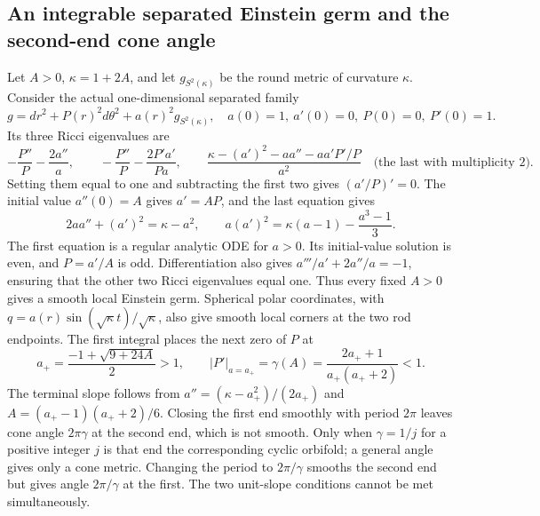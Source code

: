 \documentclass[a4paper,11pt]{article}
\numberwithin{equation}{section}
\theoremstyle{definition}
\begin{document}
\subsection{An integrable separated Einstein germ and the second-end cone angle}
Let $A>0$, $\kappa=1+2A$, and let $g_{S^2(\kappa)}$ be the round metric of curvature $\kappa$.
Consider the actual one-dimensional separated family
\begin{equation}\label{eq:toric-separated-metric}
 g=dr^2+P(r)^2d\theta^2+a(r)^2g_{S^2(\kappa)},\quad
 a(0)=1,\ a'(0)=0,\ P(0)=0,\ P'(0)=1.
\end{equation}
Its three Ricci eigenvalues are
\begin{equation}\label{eq:toric-separated-Ricci}
 -\frac{P''}{P}-\frac{2a''}{a},\qquad
 -\frac{P''}{P}-\frac{2P'a'}{Pa},\qquad
 \frac{\kappa-(a')^2-aa''-aa'P'/P}{a^2}\quad\text{(the last with multiplicity 2)}.
\end{equation}
Setting them equal to one and subtracting the first two gives $(a'/P)'=0$.
The initial value $a''(0)=A$ gives $a'=AP$, and the last equation gives
\begin{equation}\label{eq:toric-separated-first}
 2aa''+(a')^2=\kappa-a^2,\qquad
 a(a')^2=\kappa(a-1)-\frac{a^3-1}{3}.
\end{equation}
The first equation is a regular analytic ODE for $a>0$. Its initial-value solution is even, and $P=a'/A$ is odd.
Differentiation also gives $a'''/a'+2a''/a=-1$, ensuring that the other two Ricci eigenvalues equal one.
Thus every fixed $A>0$ gives a smooth local Einstein germ.
Spherical polar coordinates, with $q=a(r)\sin(\sqrt\kappa t)/\sqrt\kappa$, also give smooth local corners at the two rod endpoints.
The first integral places the next zero of $P$ at
\begin{equation}\label{eq:toric-separated-angle}
 a_+=\frac{-1+\sqrt{9+24A}}2>1,\qquad
 |P'|_{a=a_+}=\gamma(A)=\frac{2a_++1}{a_+(a_++2)}<1.
\end{equation}
The terminal slope follows from $a''=(\kappa-a_+^2)/(2a_+)$ and $A=(a_+-1)(a_++2)/6$.
Closing the first end smoothly with period $2\pi$ leaves cone angle $2\pi\gamma$ at the second end, which is not smooth.
Only when $\gamma=1/j$ for a positive integer $j$ is that end the corresponding cyclic orbifold; a general angle gives only a cone metric.
Changing the period to $2\pi/\gamma$ smooths the second end but gives angle $2\pi/\gamma$ at the first.
The two unit-slope conditions cannot be met simultaneously.
\end{document}
